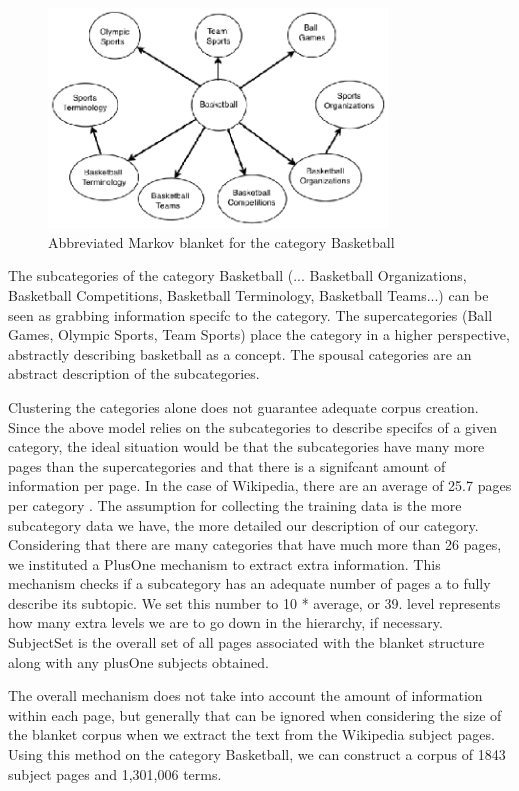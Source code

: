 \documentclass{www2010-submission}
\begin{document}
\begin{figure}[t]
\centering
\includegraphics[width=90mm]{abbrv_bb_blanket.eps}
\caption{Abbreviated Markov blanket for the category Basketball}
\label{fig:abbrv_bb_blanket}
\end{figure}

The subcategories of the category Basketball (... Basketball Organizations, Basketball Competitions, Basketball Terminology, Basketball Teams...) can be seen as grabbing information specifc to the category. The supercategories (Ball Games, Olympic Sports, Team Sports) place the category in a higher perspective, abstractly describing basketball as a concept. The spousal categories are an abstract description of the subcategories.

Clustering the categories alone does not guarantee adequate corpus creation. Since the above model relies on the subcategories to describe specifcs of a given category, the ideal situation would be that the subcategories have many more pages than the supercategories and that there is a signifcant amount of information per page. In the case of Wikipedia, there are an average of 25.7 pages per category \cite{1321474}. The assumption for collecting the training data is the more subcategory data we have, the more detailed our description of our category. Considering that there are many categories that have much more than 26 pages, we instituted a PlusOne mechanism to extract extra information. This mechanism checks if a subcategory has an adequate number of pages a to fully describe its subtopic. We set this number to 10 * average, or 39. level represents how many extra levels we are to go down in the hierarchy, if necessary. SubjectSet is the overall set of all pages associated with the blanket structure along with any plusOne subjects obtained.


The overall mechanism does not take into account the amount of information within each page, but generally that can be ignored when considering the size of the blanket corpus when we extract the text from the Wikipedia subject pages. Using this method on the category Basketball, we can construct a corpus of 1843 subject pages and 1,301,006 terms.
\end{document}
